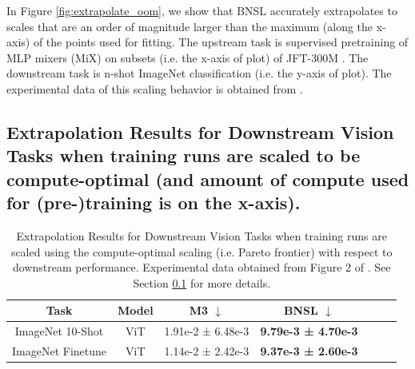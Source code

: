 \documentclass{article} %
\newcommand{\highlight}[1]{\colorbox{blue!10}{#1}}
\begin{document}
In Figure \ref{fig:extrapolate_oom}, we show that BNSL accurately extrapolates to scales that are an order of magnitude larger than the maximum (along the x-axis) of the points used for fitting. The upstream task is supervised pretraining of MLP mixers (MiX) \citep{tolstikhin2021mlp} on subsets (i.e. the x-axis of plot) of JFT-300M \citep{sun2017revisiting}. The downstream task is n-shot ImageNet classification (i.e. the y-axis of plot). The experimental data of this scaling behavior is obtained from \cite{Alabdulmohsi2022revisiting}.

\clearpage

\subsection{Extrapolation Results for Downstream Vision Tasks when training runs are scaled to be compute-optimal (and amount of compute used for (pre-)training is on the x-axis).}
\label{section:vision_tasks__compute_optimal}

\vspace{-3.5mm}

\begin{table}[hbt!]
    \centering
    \begin{tabular}{ |cc|c|c|c|c|c| } 
\hline
Task & Model & M3 $\downarrow$ & BNSL $\downarrow$\\
 \hline
 
 ImageNet 10-Shot & ViT & 1.91e-2 ± 6.48e-3 & \bfseries 9.79e-3 ± 4.70e-3\\
 ImageNet Finetune & ViT & 1.14e-2 ± 2.42e-3 & \bfseries 9.37e-3 ± 2.60e-3 \\
 \hline
\end{tabular}
\vspace{-2.5mm}
    \caption{
    Extrapolation Results for Downstream Vision Tasks when training runs are scaled using the compute-optimal scaling (i.e. Pareto frontier) with respect to downstream performance. Experimental data obtained from Figure 2 of \cite{DBLP:journals/corr/abs-2106-04560}. See Section \ref{section:vision_tasks__compute_optimal} for more details.
    }
    \label{table:vision_compute_scaling}
\end{table}
\end{document}
